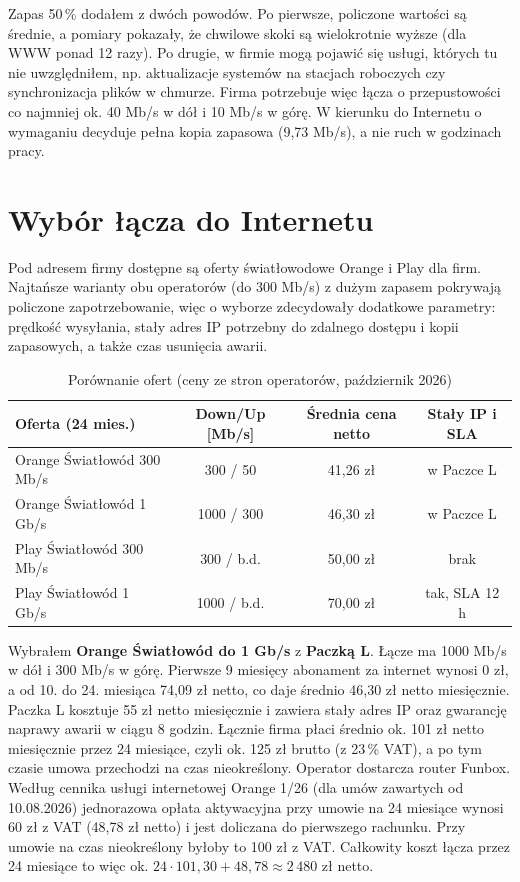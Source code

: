 \documentclass[12pt,a4paper]{article}
\begin{document}
Zapas 50\,\% dodałem z dwóch powodów. Po pierwsze, policzone wartości są średnie, a pomiary
pokazały, że chwilowe skoki są wielokrotnie wyższe (dla WWW ponad 12 razy). Po drugie, w firmie
mogą pojawić się usługi, których tu nie uwzględniłem, np. aktualizacje systemów na stacjach
roboczych czy synchronizacja plików w chmurze. Firma potrzebuje więc łącza o przepustowości
co najmniej ok. 40 Mb/s w dół i 10 Mb/s w górę. W kierunku do Internetu o wymaganiu decyduje
pełna kopia zapasowa (9,73 Mb/s), a nie ruch w godzinach pracy.

\section{Wybór łącza do Internetu}

Pod adresem firmy dostępne są oferty światłowodowe Orange i Play dla firm. Najtańsze warianty
obu operatorów (do 300 Mb/s) z dużym zapasem pokrywają policzone zapotrzebowanie, więc o wyborze
zdecydowały dodatkowe parametry: prędkość wysyłania, stały adres IP potrzebny do zdalnego
dostępu i kopii zapasowych, a także czas usunięcia awarii.

\begin{table}[H]\centering
\begin{tabular}{>{\raggedright}p{4.4cm}ccc}
\toprule
Oferta (24 mies.) & Down/Up [Mb/s] & Średnia cena netto & Stały IP i SLA \\
\midrule
Orange Światłowód 300 Mb/s & 300 / 50 & 41,26 zł & w Paczce L \\
Orange Światłowód 1 Gb/s & 1000 / 300 & 46,30 zł & w Paczce L \\
Play Światłowód 300 Mb/s & 300 / b.d. & 50,00 zł & brak \\
Play Światłowód 1 Gb/s & 1000 / b.d. & 70,00 zł & tak, SLA 12 h \\
\bottomrule
\end{tabular}
\caption{Porównanie ofert (ceny ze stron operatorów, październik 2026)}
\end{table}

Wybrałem \textbf{Orange Światłowód do 1 Gb/s} z \textbf{Paczką L}. Łącze ma 1000 Mb/s
w dół i 300 Mb/s w górę. Pierwsze 9 miesięcy abonament za internet wynosi 0 zł, a od 10.
do 24. miesiąca 74,09 zł netto, co daje średnio 46,30 zł netto miesięcznie. Paczka L kosztuje
55 zł netto miesięcznie i zawiera stały adres IP oraz gwarancję naprawy awarii w ciągu 8 godzin.
Łącznie firma płaci średnio ok. 101 zł netto miesięcznie przez 24 miesiące, czyli ok. 125 zł
brutto (z 23\,\% VAT), a po tym czasie umowa przechodzi na czas nieokreślony. Operator dostarcza router Funbox.
Według cennika usługi internetowej Orange 1/26 (dla umów zawartych od 10.08.2026) jednorazowa
opłata aktywacyjna przy umowie na 24 miesiące wynosi 60 zł z VAT (48,78 zł netto) i jest
doliczana do pierwszego rachunku. Przy umowie na czas nieokreślony byłoby to 100 zł z VAT.
Całkowity koszt łącza przez 24 miesiące to więc ok. $24 \cdot 101{,}30 + 48{,}78 \approx 2\,480$ zł netto.
\end{document}

